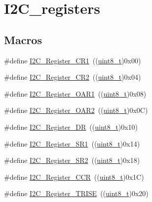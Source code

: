 \hypertarget{group___i2_c__registers}{}\section{I2\+C\+\_\+registers}
\label{group___i2_c__registers}
\subsection*{Macros}
\begin{DoxyCompactItemize}
\item 
\#define \hyperlink{group___i2_c__registers_ga4b9e7934e490c3540e50cf2f1d0a7688}{I2\+C\+\_\+\+Register\+\_\+\+C\+R1}~((\hyperlink{_p_e___types_8h_aba7bc1797add20fe3efdf37ced1182c5}{uint8\+\_\+t})0x00)
\item 
\#define \hyperlink{group___i2_c__registers_gaf278337dd03b6ae56eac3f335381eca3}{I2\+C\+\_\+\+Register\+\_\+\+C\+R2}~((\hyperlink{_p_e___types_8h_aba7bc1797add20fe3efdf37ced1182c5}{uint8\+\_\+t})0x04)
\item 
\#define \hyperlink{group___i2_c__registers_ga706317a00c0d450e95c00efd2afe1836}{I2\+C\+\_\+\+Register\+\_\+\+O\+A\+R1}~((\hyperlink{_p_e___types_8h_aba7bc1797add20fe3efdf37ced1182c5}{uint8\+\_\+t})0x08)
\item 
\#define \hyperlink{group___i2_c__registers_gaffdc1902493456dea95216a39fc54e2b}{I2\+C\+\_\+\+Register\+\_\+\+O\+A\+R2}~((\hyperlink{_p_e___types_8h_aba7bc1797add20fe3efdf37ced1182c5}{uint8\+\_\+t})0x0\+C)
\item 
\#define \hyperlink{group___i2_c__registers_gaea281721e7a8461d90bf59898487c096}{I2\+C\+\_\+\+Register\+\_\+\+DR}~((\hyperlink{_p_e___types_8h_aba7bc1797add20fe3efdf37ced1182c5}{uint8\+\_\+t})0x10)
\item 
\#define \hyperlink{group___i2_c__registers_gaf3bc5f4dc87513e2eceba4f503c14d6a}{I2\+C\+\_\+\+Register\+\_\+\+S\+R1}~((\hyperlink{_p_e___types_8h_aba7bc1797add20fe3efdf37ced1182c5}{uint8\+\_\+t})0x14)
\item 
\#define \hyperlink{group___i2_c__registers_ga0b5f7949e449223ec97e0169d79d007d}{I2\+C\+\_\+\+Register\+\_\+\+S\+R2}~((\hyperlink{_p_e___types_8h_aba7bc1797add20fe3efdf37ced1182c5}{uint8\+\_\+t})0x18)
\item 
\#define \hyperlink{group___i2_c__registers_ga7a0de765650408f3915b54141f052c5b}{I2\+C\+\_\+\+Register\+\_\+\+C\+CR}~((\hyperlink{_p_e___types_8h_aba7bc1797add20fe3efdf37ced1182c5}{uint8\+\_\+t})0x1\+C)
\item 
\#define \hyperlink{group___i2_c__registers_ga488c25a0a9f2c572af28768589fcbab2}{I2\+C\+\_\+\+Register\+\_\+\+T\+R\+I\+SE}~((\hyperlink{_p_e___types_8h_aba7bc1797add20fe3efdf37ced1182c5}{uint8\+\_\+t})0x20)

\end{DoxyCompactItemize}
